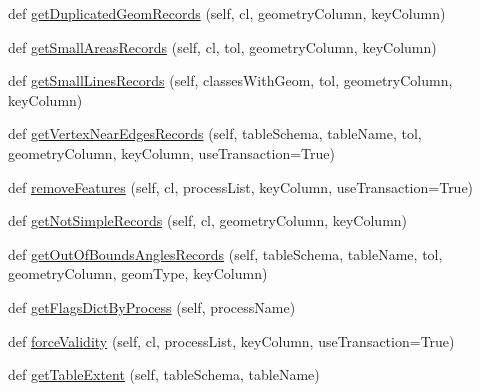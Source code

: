 \begin{DoxyCompactItemize}
\item 
def \mbox{\hyperlink{class_dsg_tools_1_1_factories_1_1_db_factory_1_1postgis_db_1_1_postgis_db_a38b56f5d9cb251ec95560f2204a95779}{get\+Duplicated\+Geom\+Records}} (self, cl, geometry\+Column, key\+Column)
\item 
def \mbox{\hyperlink{class_dsg_tools_1_1_factories_1_1_db_factory_1_1postgis_db_1_1_postgis_db_aed401d01316e2d090c18bb9d184ddcc8}{get\+Small\+Areas\+Records}} (self, cl, tol, geometry\+Column, key\+Column)
\item 
def \mbox{\hyperlink{class_dsg_tools_1_1_factories_1_1_db_factory_1_1postgis_db_1_1_postgis_db_ac61e0946b1f045ff03840a5bbb7bd339}{get\+Small\+Lines\+Records}} (self, classes\+With\+Geom, tol, geometry\+Column, key\+Column)
\item 
def \mbox{\hyperlink{class_dsg_tools_1_1_factories_1_1_db_factory_1_1postgis_db_1_1_postgis_db_a3dd2b256b38a8a296ba5df4ab7f60395}{get\+Vertex\+Near\+Edges\+Records}} (self, table\+Schema, table\+Name, tol, geometry\+Column, key\+Column, use\+Transaction=True)
\item 
def \mbox{\hyperlink{class_dsg_tools_1_1_factories_1_1_db_factory_1_1postgis_db_1_1_postgis_db_a5f3497322b0b3db4c7a2aa925ba07f3a}{remove\+Features}} (self, cl, process\+List, key\+Column, use\+Transaction=True)
\item 
def \mbox{\hyperlink{class_dsg_tools_1_1_factories_1_1_db_factory_1_1postgis_db_1_1_postgis_db_a4ace28697a1080a7f1375914f83c24f6}{get\+Not\+Simple\+Records}} (self, cl, geometry\+Column, key\+Column)
\item 
def \mbox{\hyperlink{class_dsg_tools_1_1_factories_1_1_db_factory_1_1postgis_db_1_1_postgis_db_a9e31c11791060c35255b94f5c36c9ce2}{get\+Out\+Of\+Bounds\+Angles\+Records}} (self, table\+Schema, table\+Name, tol, geometry\+Column, geom\+Type, key\+Column)
\item 
def \mbox{\hyperlink{class_dsg_tools_1_1_factories_1_1_db_factory_1_1postgis_db_1_1_postgis_db_a97b87cae87f92baded73ccea3f5b85cc}{get\+Flags\+Dict\+By\+Process}} (self, process\+Name)
\item 
def \mbox{\hyperlink{class_dsg_tools_1_1_factories_1_1_db_factory_1_1postgis_db_1_1_postgis_db_a0f61c48440ee4fa26614b6adf7d55429}{force\+Validity}} (self, cl, process\+List, key\+Column, use\+Transaction=True)
\item 
def \mbox{\hyperlink{class_dsg_tools_1_1_factories_1_1_db_factory_1_1postgis_db_1_1_postgis_db_a060cff436f63056b1f4ef9ce59caf5bd}{get\+Table\+Extent}} (self, table\+Schema, table\+Name)

\end{DoxyCompactItemize}
